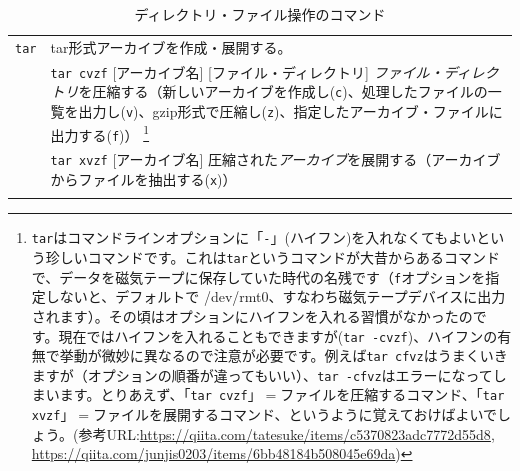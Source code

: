 \documentclass[a4j]{ltjsreport}
\begin{document}
\begin{longtable}[c]{|p{3.5cm}|p{13.5cm}|}
        \texttt{tar} &tar形式アーカイブを作成・展開する。\\
        &\texttt{tar cvzf} [アーカイブ名] [ファイル・ディレクトリ] \emph{ファイル・ディレクトリ}を圧縮する（新しいアーカイブを作成し(\texttt{c})、処理したファイルの一覧を出力し(\texttt{v})、gzip形式で圧縮し(\texttt{z})、指定したアーカイブ・ファイルに出力する(\texttt{f})）
        \footnote{\texttt{tar}はコマンドラインオプションに「\texttt{-}」(ハイフン)を入れなくてもよいという珍しいコマンドです。これは\texttt{tar}というコマンドが大昔からあるコマンドで、データを磁気テープに保存していた時代の名残です（\texttt{f}オプションを指定しないと、デフォルトで /dev/rmt0、すなわち磁気テープデバイスに出力されます）。その頃はオプションにハイフンを入れる習慣がなかったのです。現在ではハイフンを入れることもできますが(\texttt{tar -cvzf})、ハイフンの有無で挙動が微妙に異なるので注意が必要です。例えば\texttt{tar cfvz}はうまくいきますが（オプションの順番が違ってもいい）、\texttt{tar -cfvz}はエラーになってしまいます。とりあえず、「\texttt{tar cvzf}」$=$ファイルを圧縮するコマンド、「\texttt{tar xvzf}」$=$ファイルを展開するコマンド、というように覚えておけばよいでしょう。(参考URL:\url{https://qiita.com/tatesuke/items/c5370823adc7772d55d8}, \url{https://qiita.com/junjis0203/items/6bb48184b508045e69da})} \\
        &\texttt{tar xvzf} [アーカイブ名] 圧縮された\emph{アーカイブ}を展開する（アーカイブからファイルを抽出する(\texttt{x})）\\
        \hline
    
        \caption{ディレクトリ・ファイル操作のコマンド}
    \end{longtable}
    
\end{document}

